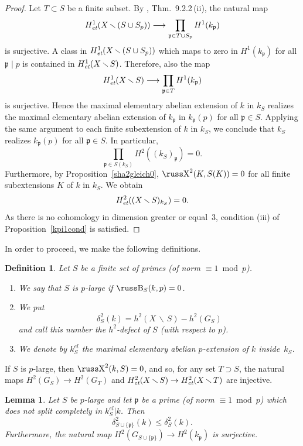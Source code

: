 \documentclass[10pt]{article}
\def\mapr#1{\stackrel{#1}{\longrightarrow}}
\newcommand{\p}{{\mathfrak p}}
\newcommand{\sm}{{\,\smallsetminus\,}}
\newcommand{\et}{\text{\it et}}
\def\Sha{\hbox{\russ\char88}}
\def\Be{\hbox{\russ\char66}}
\theoremstyle{alex}
\newtheorem{lemma}[theorem]{Lemma}
\theoremstyle{alexdef}
\newtheorem*{definition}{Definition}
\begin{document}
\begin{proof} Let $T\subset S$ be a finite subset. By \cite{NSW}, Thm.~9.2.2\,(ii), the natural map
\[
H^1_\et(X\sm (S\cup S_p)) \longrightarrow \prod_{\p\in T\cup S_p} H^1(k_\p)
\]
is surjective. A class in $H^1_\et(X\sm (S\cup S_p))$ which maps to zero in $H^1(k_\p)$ for all $\p \mid p$ is contained in $H^1_\et(X\sm S)$. Therefore, also the map
\[
H^1_\et(X\sm S) \longrightarrow \prod_{\p\in T} H^1(k_\p)
\]
is surjective.
Hence the maximal elementary abelian extension of $k$ in $k_S$ realizes the maximal elementary abelian extension of $k_\p$ in $k_\p(p)$ for all $\p\in S$. Applying the same argument to each finite subextension of $k$ in $k_S$, we conclude that $k_S$ realizes $k_\p(p)$ for all $\p\in S$. In particular,
\[
\prod_{\p \in S(k_S)} H^2((k_S)_\p) =0.
\]
Furthermore, by Proposition~\ref{sha2gleich0}, $\Sha^2(K,S(K))=0$ for all finite subextensions $K$ of $k$ in $k_S$. We obtain
\[
H^2_\et((X\sm S)_{k_S})=0.
\]
As there is no cohomology in dimension greater or equal~$3$, condition (iii) of Proposition~\ref{kpi1cond} is satisfied.
\end{proof}

In order to proceed, we make the following definitions.

\begin{definition} Let $S$ be a finite set of primes (of norm $\equiv 1 \bmod p$).
\begin{enumerate}
\item[\rm (i)] We say that $S$ is $p$-large if\/ $\Be_S(k,p)=0$.
\item[\rm (ii)] We put
\[
\delta^2_S(k)= h^2(X\sm S)- h^2(G_S)
\]
and call this number the $h^2$-defect of\/ $S$ (with respect to $p$).
\item[\rm (iii)] We denote by $k_S^{el}$ the maximal elementary abelian $p$-extension of $k$ inside~$k_S$.
\end{enumerate}
\end{definition}

\noindent
If $S$ is $p$-large, then $\Sha^2(k,S)=0$, and so, for any set $T\supset S$, the natural maps
$H^2(G_S)\to H^2(G_T)$ and $H^2_\et(X\sm S) \to H^2_\et(X\sm T)$ are injective.

\begin{lemma}\label{einsdazu}
Let $S$ be $p$-large and let $\p$ be a prime (of norm $\equiv 1 \bmod p$) which does not split completely in $k_S^{el}|k$. Then
\[
\delta^2_{S\cup \{\p\}}(k)\leq \delta^2_S(k).
\]
Furthermore, the natural map $H^2(G_{S\cup\{\p\}}) \mapr{} H^2(k_\p)$ is surjective.
\end{lemma}
\end{document}
